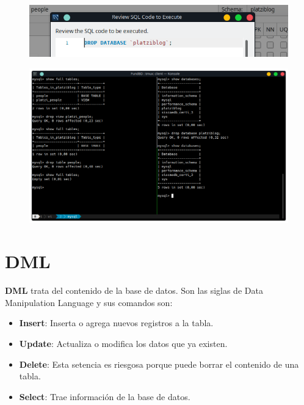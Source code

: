 \documentclass{article}
\begin{document}
\begin{figure}[h!]
  \centering
  \includegraphics[scale=0.75]{./Pictures/061_drop_database.png}
\end{figure}

\begin{figure}[h!]
  \centering
  \includegraphics[scale=0.65]{./Pictures/148_ddl_drop.png}
\end{figure}

\section{DML}%
\textbf{DML} trata del contenido de la base de datos. Son las siglas de Data
Manipulation Language y sus comandos son:
\begin{itemize}
  \item \textbf{Insert}: Inserta o agrega nuevos registros a la tabla.
  \item \textbf{Update}: Actualiza o modifica los datos que ya existen.
  \item \textbf{Delete}: Esta setencia es riesgosa porque puede borrar el contenido de una tabla.
  \item \textbf{Select}: Trae información de la base de datos.
\end{itemize}
\end{document}
